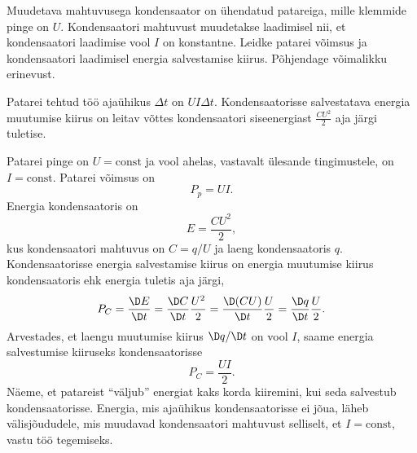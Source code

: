 
Muudetava mahtuvusega kondensaator on ühendatud patareiga,
mille klemmide pinge on $U$. Kondensaatori mahtuvust muudetakse laadimisel nii, et
kondensaatori laadimise vool $I$ on konstantne. Leidke patarei võimsus ja kondensaatori laadimisel energia salvestamise kiirus.
Põhjendage võimalikku erinevust.

\hint
Patarei tehtud töö ajaühikus $\Delta t$ on $UI\Delta t$. Kondensaatorisse salvestatava energia muutumise kiirus on leitav võttes kondensaatori siseenergiast $\frac{CU^2}{2}$ aja järgi tuletise.

\solu
Patarei pinge on $U=\text{const}$ ja vool ahelas, vastavalt ülesande tingimustele, on $I=\text{const}$. Patarei võimsus on
\[P_p=UI. \]
Energia kondensaatoris on
\[E=\frac{CU^2}{2}, \]
kus kondensaatori mahtuvus on $C=q/U$ ja laeng kondensaatoris $q$.
Kondensaatorisse energia salvestamise kiirus on energia muutumise kiirus kondensaatoris ehk energia tuletis aja järgi,
\[P_C=\frac{\D E}{\D t}=\frac{\D C}{\D t}\frac{U^2}{2}=\frac{\D (CU)}{\D t}\frac{U}{2}=\frac{\D q}{\D t}\frac{U}{2}.\]
Arvestades, et laengu muutumise kiirus $\D q/\D t$ on vool $I$, saame energia salvestumise kiiruseks kondensaatorisse
\[P_C=\frac{UI}{2}.\]
Näeme, et patareist \enquote{väljub} energiat kaks korda kiiremini, kui seda salvestub kondensaatorisse. Energia, mis ajaühikus kondensaatorisse ei jõua, läheb välisjõududele, mis muudavad kondensaatori mahtuvust selliselt, et $I=\text{const}$, vastu töö tegemiseks.
\probend